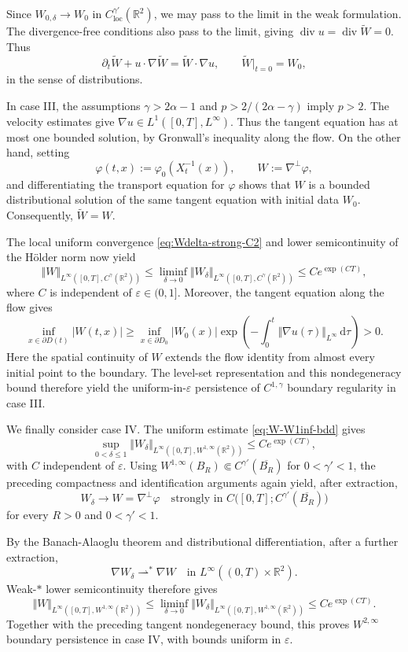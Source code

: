 \documentclass[reqno,11pt,a4paper]{amsart}
\newcommand{\dd}{\mathrm{d}}
\begin{document}
Since $W_{0,\delta}\to W_0$ in
$C^{\gamma'}_{\mathrm{loc}}(\mathbb R^2)$,
we may pass to the limit in the weak formulation.
The divergence-free conditions also pass to the limit,
giving $\operatorname{div}u=\operatorname{div}\widetilde W=0$.
Thus
\[
  \partial_t\widetilde W+u\cdot\nabla\widetilde W
  =\widetilde W\cdot\nabla u,
  \qquad
  \widetilde W|_{t=0}=W_0,
\]
in the sense of distributions.

In case III, the assumptions
$\gamma>2\alpha-1$ and $p>2/(2\alpha-\gamma)$ imply $p>2$.
The velocity estimates give
$\nabla u\in L^1([0,T],L^\infty)$.
Thus the tangent equation has at most one bounded solution,
by Gronwall's inequality along the flow.
On the other hand, setting
\[
  \varphi(t,x):=\varphi_0(X_t^{-1}(x)),
  \qquad W:=\nabla^\perp\varphi,
\]
and differentiating the transport equation for $\varphi$
shows that $W$ is a bounded distributional solution of
the same tangent equation with initial data $W_0$.
Consequently, $\widetilde W=W$.

The local uniform convergence
\eqref{eq:Wdelta-strong-C2} and lower semicontinuity
of the H\"older norm now yield
\[
  \Vert W\Vert _{L^\infty([0,T],C^\gamma(\mathbb R^2))}
  \leq
  \liminf_{\delta\to0}
  \Vert W_\delta\Vert _{L^\infty([0,T],C^\gamma(\mathbb R^2))}
  \leq Ce^{\exp(CT)},
\]
where $C$ is independent of $\varepsilon\in(0,1]$.
Moreover, the tangent equation along the flow gives
\[
  \inf_{x\in\partial D(t)}|W(t,x)|
  \geq
  \inf_{x\in\partial D_0}|W_0(x)|
  \exp\left(
    -\int_0^t\Vert \nabla u(\tau)\Vert _{L^\infty}\,\dd\tau
  \right)>0.
\]
Here the spatial continuity of $W$ extends the flow identity
from almost every initial point to the boundary.
The level-set representation and this nondegeneracy bound
therefore yield the uniform-in-$\varepsilon$ persistence
of $C^{1,\gamma}$ boundary regularity in case III.

We finally consider case IV.
The uniform estimate \eqref{eq:W-W1inf-bdd} gives
\[
  \sup_{0<\delta\leq1}
  \Vert W_\delta\Vert _{L^\infty([0,T],W^{1,\infty}(\mathbb R^2))}
  \leq Ce^{\exp(CT)},
\]
with $C$ independent of $\varepsilon$.
Using
$W^{1,\infty}(B_R)\Subset C^{\gamma'}(\overline{B_R})$
for $0<\gamma'<1$, the preceding compactness and
identification arguments again yield, after extraction,
\[
  W_\delta\longrightarrow W=\nabla^\perp\varphi
  \quad\text{strongly in }
  C\bigl([0,T];C^{\gamma'}(\overline{B_R})\bigr)
\]
for every $R>0$ and $0<\gamma'<1$.

By the Banach-Alaoglu theorem and distributional
differentiation, after a further extraction,
\[
  \nabla W_\delta\rightharpoonup^\ast\nabla W
  \quad\text{in }L^\infty((0,T)\times\mathbb R^2).
\]
Weak-$\ast$ lower semicontinuity therefore gives
\[
  \Vert W\Vert _{L^\infty([0,T],W^{1,\infty}(\mathbb R^2))}
  \leq
  \liminf_{\delta\to0}
  \Vert W_\delta\Vert _{L^\infty([0,T],W^{1,\infty}(\mathbb R^2))}
  \leq Ce^{\exp(CT)}.
\]
Together with the preceding tangent nondegeneracy bound,
this proves $W^{2,\infty}$ boundary persistence
in case IV, with bounds uniform in $\varepsilon$.
\end{document}
